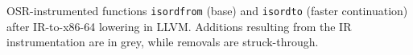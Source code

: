 \label{fig:isordx86-64} OSR-instrumented functions {\tt isordfrom} (base) and {\tt isordto} (faster continuation) after IR-to-x86-64 lowering in LLVM. %
Additions resulting from the IR instrumentation are in grey, while removals are struck-through.